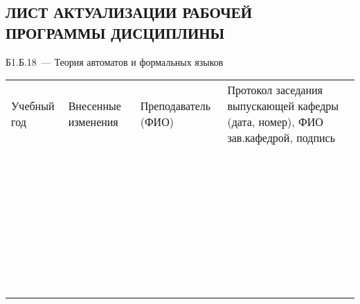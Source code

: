 \documentclass[a4paper,12pt]{article}
\begin{document}
\newpage
\begin{center}
\section*{ЛИСТ АКТУАЛИЗАЦИИ РАБОЧЕЙ ПРОГРАММЫ ДИСЦИПЛИНЫ}
Б1.Б.18\ --- Теория автоматов и формальных языков 
\end{center}

  \noindent
  \begin{tabular}{|p{15mm}|p{67mm}|p{25mm}|p{41mm}|}
    \hline
    \small\centering
    Учебный год 
    & \small\centering
    Внесенные изменения 
    & \small\centering
    Преподаватель (ФИО) 
    & \small\centering\arraybackslash
    Протокол заседания выпускающей кафедры (дата, номер), ФИО зав.кафедрой, подпись \\
    & & & \\\hline
    & & & \\\hline
    & & & \\\hline
    & & & \\\hline
    & & & \\\hline
    & & & \\\hline
    & & & \\\hline
    & & & \\\hline
    & & & \\\hline
    & & & \\\hline
    & & & \\\hline
    & & & \\\hline
    & & & \\\hline
    & & & \\\hline
    & & & \\\hline
    & & & \\\hline
    & & & \\\hline
    & & & \\\hline
    & & & \\\hline
    & & & \\\hline
    & & & \\\hline
    & & & \\\hline
    & & & \\\hline
    & & & \\\hline
    & & & \\\hline
    & & & \\\hline
    & & & \\\hline
    & & & \\\hline
    & & & \\\hline
    & & & \\\hline
    & & & \\\hline
    & & & \\\hline
    & & & \\\hline
    & & & \\\hline
    & & & \\\hline
    & & & \\\hline
  \end{tabular}
\end{document}
